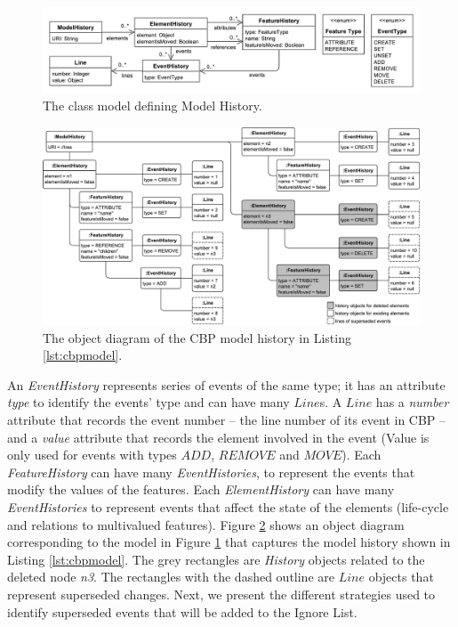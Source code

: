 \documentclass{llncs}
\begin{document}
\vspace{-20pt}    
\begin{figure}[ht]
\centering
\includegraphics[width=\linewidth]{object_history}
\caption{The class model defining Model History.}
\label{fig:object_history}
    \end{figure}

\vspace{-30pt}
\begin{figure}[ht]
\centering
\includegraphics[width=\linewidth]{history_structure}
\caption{The object diagram of the CBP model history in Listing \ref{lst:cbpmodel}.}
\label{fig:history_structure}
\end{figure}
    
    
    An \emph{EventHistory} represents series of events of the same type; it has an attribute \emph{type} to identify the events' type and can have many \emph{$Line$}s. A \emph{$Line$} has a \emph{number} attribute that records the event number -- the line number of its event in CBP -- and a \emph{value} attribute that records the element involved in the event (Value is only used for events with types \emph{$ADD$}, \emph{$REMOVE$} and \emph{$MOVE$}). Each \emph{FeatureHistory} can have many \emph{EventHistories}, to represent the events that modify the values of the features. Each \emph{ElementHistory} can have many \emph{EventHistories} to represent events that affect the state of the elements (life-cycle and relations to multivalued features). Figure \ref{fig:history_structure} shows an object diagram corresponding to the model in Figure \ref{fig:object_history} that captures the model history shown in Listing \ref{lst:cbpmodel}. The grey rectangles are \emph{History} objects related to the deleted node \emph{n3}. The rectangles with the dashed outline are \emph{$Line$} objects that represent superseded changes. Next, we present the different strategies used to identify superseded events that will be added to the Ignore List.   
    
\end{document}
